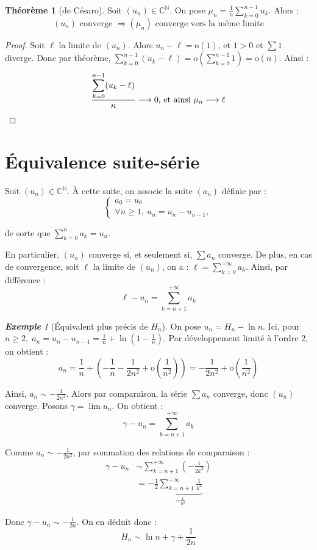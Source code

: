 \documentclass[12pt]{book}
\let\ensembleNombre\mathbb
\newcommand*\N{\ensuremath{\ensembleNombre{N}}}
\newcommand*\C{\ensuremath{\ensembleNombre{C}}}
\theoremstyle{definition}
\newtheorem{thme}{Théorème}[chapter]
\theoremstyle{remark}
\newtheorem*{ex}{\textbf{Exemple}}
\newenvironment{fthme}
  {\begin{mdframed}[roundcorner=10pt, linewidth=2pt]\begin{thme}}
  {\end{thme}\end{mdframed}}
\begin{document}
	\begin{fthme}[de Césaro] Soit $(u_n) \in \C^\N$. On pose $\mu_n = \frac{1}{n} \sum_{k=0}^{n-1} u_k$. Alors :
	\[(u_n) \text{ converge } \Longrightarrow (\mu_n) \text{ converge vers la même limite}\]
	\end{fthme}
	\begin{proof}
	Soit $\ell$ la limite de $(u_n)$. Alors $u_n - \ell = \mathrm o(1)$, et $1 > 0$ et $\sum 1$ diverge. Donc par théorème, $\sum_{k=0}^{n-1} (u_k - \ell) = \mathrm o \left( \sum_{k=0}^{n-1} 1 \right) = \mathrm o(n)$. Ainsi :
	\[ \dfrac{\displaystyle{\sum_{k=0}^{n-1} (u_k - \ell)}}{n} \longrightarrow 0 \text{, et ainsi } \mu_n \longrightarrow \ell \qedhere\] 
	\end{proof}
	
	\section{Équivalence suite-série}
	Soit $(u_n) \in \C^\N$. À cette suite, on associe la suite $(a_n)$ définie par : 
	\[
	\begin{cases}
	a_0 = u_0 \\
	\forall n\geq 1,\; a_n = u_n - u_{n-1},
	\end{cases}
	\]
	
	de sorte que $\boxed{\sum_{k=0}^n a_k = u_n.}$ 
	
	En particulier, $(u_n)$ converge si, et seulement si, $\sum a_n$ converge. De plus, en cas de convergence, soit $\ell$ la limite de $(u_n)$, on a : $\ell = \sum_{k=0}^{+\infty} a_k$. Ainsi, par différence : 
	\[\boxed{ \ell - u_n =\sum_{k=n+1}^{+\infty} a_k }\]
	
	\begin{ex}[Équivalent plus précis de $H_n$]
	On pose $u_n = H_n - \ln n$. Ici, pour $n \geq 2, \; a_n = u_n - u_{n-1} = \frac{1}{n} + \ln \left( 1 - \frac{1}{n} \right)$. Par développement limité à l'ordre 2, on obtient :
	\[a_n = \frac{1}{n} + \left( -\frac{1}{n} - \frac{1}{2n^2} + \mathrm o \left( \frac{1}{n^2} \right) \right) = -\frac{1}{2n^2} + \mathrm o \left(\frac{1}{n^2} \right)\]
	
	Ainsi, $a_n \sim -\frac{1}{2n^2}$. Alors par comparaison, la série $\sum a_n$ converge, donc $(u_n)$ converge. Posons $\gamma = \lim u_n$. On obtient :
	\[\gamma - u_n = \sum_{k=n+1}^{+\infty} a_k\]
	
	Comme $a_n \sim -\frac{1}{2n^2}$, par sommation des relations de comparaison :
	\begin{align*}
	\gamma - u_n &\sim \sum_{k=n+1}^{+\infty} \left( -\frac{1}{2k^2} \right) \\
	&= -\frac{1}{2} \underbrace{\sum_{k=n+1}^{+\infty} \frac{1}{k^2}}_{\sim \frac{1}{n^2}}
	\end{align*}
	
	Donc $\gamma - u_n \sim -\frac{1}{2n}$. On en déduit donc : 
	\[ \boxed{ H_n \sim \ln n + \gamma + \frac{1}{2n} } \]
	\end{ex}
	
\end{document}
